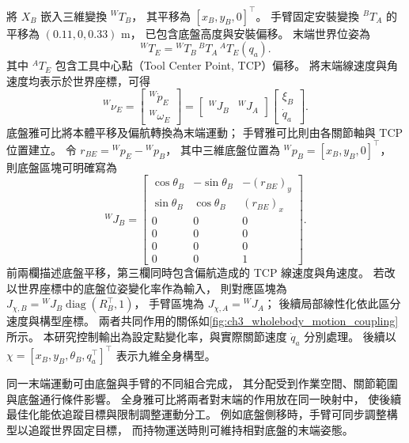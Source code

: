 將 $X_B$ 嵌入三維變換 $ {}^WT_B$，
其平移為 $[x_B,y_B,0]^{\top}$。
手臂固定安裝變換 $ {}^BT_A$ 的平移為 $(0.11,0,0.33)$ m，
已包含底盤高度與安裝偏移。
末端世界位姿為
\begin{equation}
    {}^WT_E={}^WT_B\,{}^BT_A\,{}^AT_E(q_a).
    \label{eq:ch3_wholebody_forward_kinematics}
\end{equation}
其中 $ {}^AT_E$ 包含工具中心點（Tool Center Point, TCP）偏移。
將末端線速度與角速度均表示於世界座標，可得
\begin{equation}
    {}^W\nu_E=
    \begin{bmatrix}{}^W\dot p_E\\{}^W\omega_E\end{bmatrix}
    =
    \begin{bmatrix}{}^WJ_B&{}^WJ_A\end{bmatrix}
    \begin{bmatrix}\xi_B\\\dot q_a\end{bmatrix}.
    \label{eq:ch3_wholebody_geometric_velocity}
\end{equation}
底盤雅可比將本體平移及偏航轉換為末端運動；
手臂雅可比則由各關節軸與 TCP 位置建立。
令 $r_{BE}={}^Wp_E-{}^Wp_B$，
其中三維底盤位置為 $ {}^Wp_B=[x_B,y_B,0]^\top$，
則底盤區塊可明確寫為
\begin{equation}
    {}^WJ_B=
    \begin{bmatrix}
        \cos\theta_B&-\sin\theta_B&-(r_{BE})_y\\
        \sin\theta_B& \cos\theta_B& (r_{BE})_x\\
        0&0&0\\
        0&0&0\\
        0&0&0\\
        0&0&1
    \end{bmatrix}.
    \label{eq:ch3_base_geometric_jacobian}
\end{equation}
前兩欄描述底盤平移，第三欄同時包含偏航造成的 TCP 線速度與角速度。
若改以世界座標中的底盤位姿變化率作為輸入，
則對應區塊為
$J_{\chi,B}={}^WJ_B\operatorname{diag}(R_B^\top,1)$，
手臂區塊為 $J_{\chi,A}={}^WJ_A$；
後續局部線性化依此區分速度與構型座標。
兩者共同作用的關係如\cref{fig:ch3_wholebody_motion_coupling}所示。
本研究控制輸出為設定點變化率，與實際關節速度 $\dot q_a$ 分別處理。
後續以 $\chi=[x_B,y_B,\theta_B,q_a^\top]^\top$ 表示九維全身構型。

同一末端運動可由底盤與手臂的不同組合完成，
其分配受到作業空間、關節範圍與底盤通行條件影響。
全身雅可比將兩者對末端的作用放在同一映射中，
使後續最佳化能依追蹤目標與限制調整運動分工。
例如底盤側移時，手臂可同步調整構型以追蹤世界固定目標，
而持物運送時則可維持相對底盤的末端姿態。

